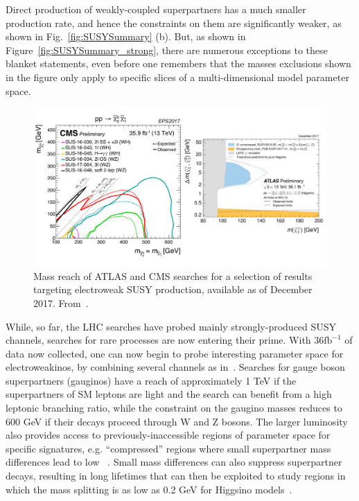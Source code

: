 
Direct production of weakly-coupled superpartners has a much smaller production rate, and hence the constraints on them are significantly weaker, as shown in Fig.~\ref{fig:SUSYSummary} (b). But, as shown in Figure~\ref{fig:SUSYSummary_strong}, there are numerous exceptions to these blanket statements, even before one remembers that the masses exclusions shown in the figure only apply to specific slices of a multi-dimensional model parameter space.

\begin{figure}[!htpb]
\includegraphics[width=\textwidth]{figures/SUSY_electroweak.pdf}
\caption{Mass reach of ATLAS and CMS searches for a selection of results targeting electroweak SUSY production, available as of December 2017. From~\cite{ATLASSUSYSummary,CMSSUSYSummary}.\label{fig:SUSYSummary_ew}}
\end{figure}


While, so far, the LHC searches have probed mainly strongly-produced SUSY channels, searches for rare processes are now entering their prime. With $36 \textrm{fb}^{-1}$ of data now collected, one can now begin to probe interesting parameter space for electroweakinos, by combining several channels as in~\cite{Sirunyan:2018ubx}. 
Searches for gauge boson superpartners (gauginos) have a reach of approximately 1 TeV if the superpartners of SM leptons are light and the search can benefit from a high leptonic branching ratio, while the constraint on the gaugino masses reduces to 600 GeV if their decays proceed through W and Z bosons. 
The larger luminosity also provides access to previously-inaccessible regions of parameter space for specific signatures, e.g. ``compressed'' regions where small superpartner mass differences lead to low \MET~\cite{Aaboud:2017leg}. 
Small mass differences can also suppress superpartner decays, resulting in long lifetimes that can then be exploited to study regions in which the mass splitting is as low as 0.2 GeV for Higgsino models~\cite{ATL-PHYS-PUB-2017-019}. 

